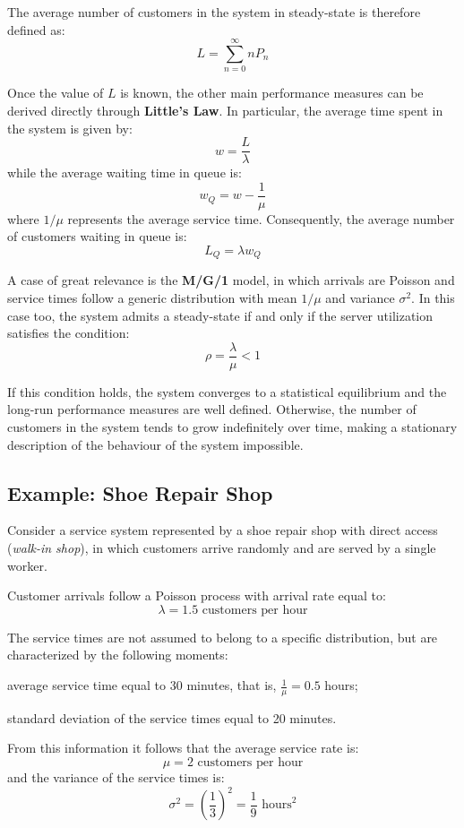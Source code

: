 The average number of customers in the system in steady-state is therefore defined as:
\[
L = \sum_{n=0}^{\infty} n P_n
\]

Once the value of $L$ is known, the other main performance measures can be derived directly through \textbf{Little’s Law}. In particular, the average time spent in the system is given by:
\[
w = \frac{L}{\lambda}
\]
while the average waiting time in queue is:
\[
w_Q = w - \frac{1}{\mu}
\]
where $1/\mu$ represents the average service time. Consequently, the average number of customers waiting in queue is:
\[
L_Q = \lambda w_Q
\]

A case of great relevance is the \textbf{M/G/1} model, in which arrivals are Poisson and service times follow a generic distribution with mean $1/\mu$ and variance $\sigma^2$. In this case too, the system admits a steady-state if and only if the server utilization satisfies the condition:
\[
\rho = \frac{\lambda}{\mu} < 1
\]

If this condition holds, the system converges to a statistical equilibrium and the long-run performance measures are well defined. Otherwise, the number of customers in the system tends to grow indefinitely over time, making a stationary description of the behaviour of the system impossible.

\subsection{Example: Shoe Repair Shop}

Consider a service system represented by a shoe repair shop with direct access (\emph{walk-in shop}), in which customers arrive randomly and are served by a single worker.

Customer arrivals follow a Poisson process with arrival rate equal to:
\[
\lambda = 1.5 \text{ customers per hour}
\]

The service times are not assumed to belong to a specific distribution, but are characterized by the following moments:
\begin{compactitemize}
    \item average service time equal to 30 minutes, that is, $\frac{1}{\mu} = 0.5$ hours;
    \item standard deviation of the service times equal to 20 minutes.
\end{compactitemize}

From this information it follows that the average service rate is:
\[
\mu = 2 \text{ customers per hour}
\]
and the variance of the service times is:
\[
\sigma^2 = \left(\frac{1}{3}\right)^2 = \frac{1}{9} \text{ hours}^2
\]

